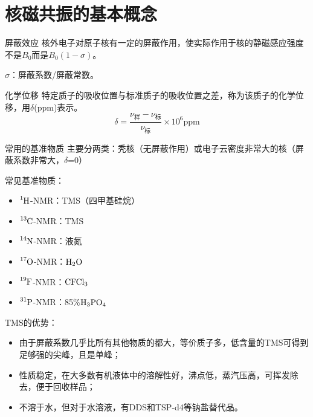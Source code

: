 \section{核磁共振的基本概念}
\begin{definition*}{屏蔽效应}{}
	核外电子对原子核有一定的屏蔽作用，使实际作用于核的静磁感应强度不是$B_0$而是$B_0(1-\sigma)$。 
	
	$\sigma$：屏蔽系数/屏蔽常数。
\end{definition*}

\begin{definition*}{化学位移}{}
	特定质子的吸收位置与标准质子的吸收位置之差，称为该质子的化学位移，用$\delta$(ppm)表示。
	\begin{equation*}
		\delta=\dfrac{\nu_{\text{样}}-\nu_{\text{标}}}{\nu_{\text{标}}}\times 10^6 \mathrm{ppm}
	\end{equation*}
\end{definition*}

\begin{emptytcb*}{常用的基准物质}{}
	主要分两类：秃核（无屏蔽作用）或电子云密度非常大的核（屏蔽系数非常大，$\delta$=0）
	
	常见基准物质： 
	\begin{itemize}
		\item $\ce{^{1}H}$-NMR：TMS（四甲基硅烷）	
		\item $\ce{^{13}C}$-NMR：TMS
		\item $\ce{^{14}N}$-NMR：液氮		
		\item $\ce{^{17}O}$-NMR：$\ce{H2O}$
		\item $\ce{^{19}F}$-NMR：$\ce{CFCl3}$
		\item $\ce{^{31}P}$-NMR：85\%$\ce{H3PO4}$
	\end{itemize}	
\end{emptytcb*}

TMS的优势：
\begin{itemize}
	\item 由于屏蔽系数几乎比所有其他物质的都大，等价质子多，低含量的TMS可得到足够强的尖峰，且是单峰；
	\item 性质稳定，在大多数有机液体中的溶解性好，沸点低，蒸汽压高，可挥发除去，便于回收样品；
	\item 不溶于水，但对于水溶液，有DDS和TSP-d4等钠盐替代品。
\end{itemize}

